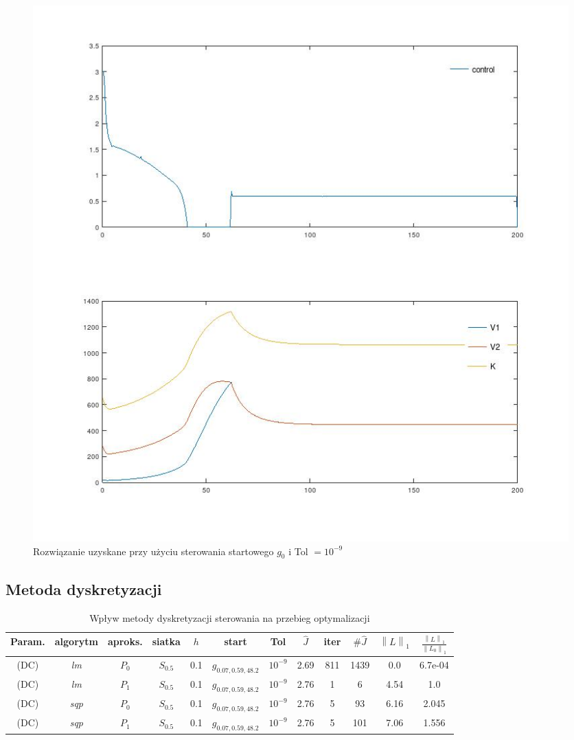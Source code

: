 \documentclass[licencjacka]{pracamgr}
\newcommand{\norm}[1]{\left\lVert#1\right\rVert}
\begin{document}
\begin{figure}[h]
  \centering
  \includegraphics[width=.5\textwidth]{../plots/plot_zprc}
  \caption{Rozwiązanie uzyskane przy użyciu sterowania startowego $g_0$ i Tol $= 10^{-9}$}\label{test_zero_9}
\end{figure}

\subsection{Metoda dyskretyzacji}

\begin{table}[h!]
  \begin{center}
    \begin{tabular}{|c|c|c|c|c|c|c||c|c|c|c|c|}
      \hline
      Param. & algorytm & aproks. & siatka & $h$ & start & Tol & $\hat{J}$ & iter & $\#\hat{J}$ & $\norm{L}_1$ & $\frac{\norm{L}_1}{\norm{L_0}_1}$ \\
      \hline
      (DC) & {\it lm\/} & $P_0$ & $S_{0.5}$ & 0.1 & $g_{0.07,0.59,48.2}$ & $10^{-9}$ & 2.69 & 811 & 1439 & 0.0 & 6.7e-04 \\
      \hline
      (DC) & {\it lm\/} & $P_1$ & $S_{0.5}$ & 0.1 & $g_{0.07,0.59,48.2}$ & $10^{-9}$ & 2.76 & 1 & 6 & 4.54 & 1.0 \\
      \hline
      (DC) & {\it sqp\/} & $P_0$ & $S_{0.5}$ & 0.1 & $g_{0.07,0.59,48.2}$ & $10^{-9}$ & 2.76 & 5 & 93 & 6.16 & 2.045 \\
      \hline
      (DC) & {\it sqp\/} & $P_1$ & $S_{0.5}$ & 0.1 & $g_{0.07,0.59,48.2}$ & $10^{-9}$ & 2.76 & 5 & 101 & 7.06 & 1.556 \\
      \hline
    \end{tabular}
    \caption{Wpływ metody dyskretyzacji sterowania na przebieg optymalizacji}\label{discr_tbl}
  \end{center}
\end{table}
\end{document}
